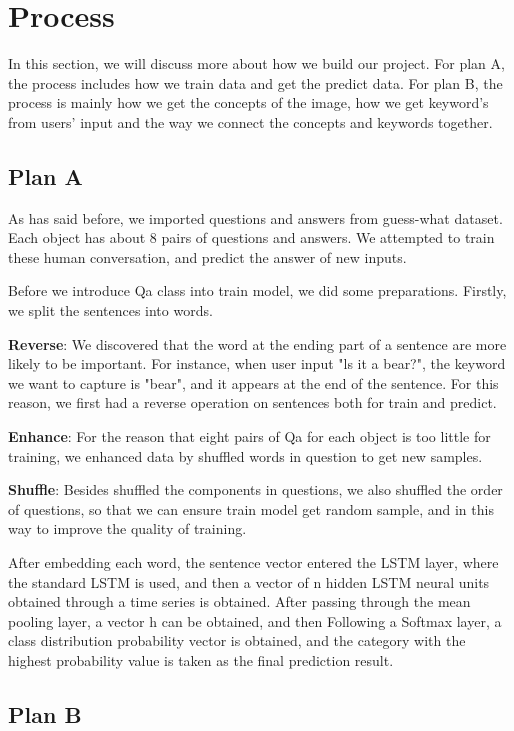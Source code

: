 \documentclass[11pt,a4paper]{article}
\begin{document}
\section{Process}

In this section, we will discuss more about how we build our project. For plan A, the process includes how we train data and get the predict data. For plan B, the process is mainly how we get the concepts of the image, how we get keyword's from users' input and the way we connect the concepts and keywords together.


\subsection{Plan A}
\label{ssec:accessibility}
As has said before, we imported questions and answers from guess-what dataset. Each object has about 8 pairs of questions and answers. We attempted to train these human conversation, and predict the answer of new inputs. 

Before we introduce Qa class into train model, we did some preparations. Firstly, we split the sentences into words.

{\bf Reverse}: We discovered that the word at the ending part of a sentence are more likely to be important. For instance, when user input "ls it a bear?", the keyword we want to capture is "bear", and it appears at the end of the sentence. For this reason, we first had a reverse operation on sentences both for train and predict.

{\bf Enhance}: For the reason that eight pairs of Qa for each object is too little for training, we enhanced data by shuffled words in question to get new samples.

{\bf Shuffle}: Besides shuffled the components in questions, we also shuffled the order of questions, so that we can ensure train model get random sample, and in this way to improve the quality of training.

After embedding each word, the sentence vector entered the LSTM layer, where the standard LSTM is used, and then a vector of n hidden LSTM neural units obtained through a time series is obtained. After passing through the mean pooling layer, a vector h can be obtained, and then Following a Softmax layer, a class distribution probability vector is obtained, and the category with the highest probability value is taken as the final prediction result.


\subsection{Plan B}
\label{ssec:accessibility}
\end{document}
